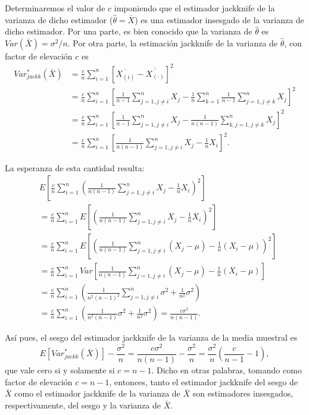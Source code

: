 \documentclass[
]{book}
\theoremstyle{break}
\theoremstyle{definition}
\theoremstyle{definition}
\theoremstyle{definition}
\theoremstyle{definition}
\theoremstyle{remark}
\begin{document}
Determinaremos el valor de \(c\) imponiendo que el estimador jackknife de la varianza de dicho estimador (\(\hat{\theta}=\bar{X}\)) es una estimador insesgado de la varianza de dicho estimador.
Por una parte, es bien conocido que la varianza de \(\hat{\theta}\) es \(Var\left( \bar{X} \right) = \sigma^2 /n\).
Por otra parte, la estimación jackknife de la varianza de \(\hat{\theta}\), con factor de elevación \(c\) es
\[\begin{aligned}
Var_{jackk}^{\ast}\left( \bar{X} \right) 
&= \frac{c}{n}\sum_{i=1}^{n}\left[ \overline{X_{(i)}}
-\overline{\overline{X_{\left( \cdot \right)}}}\right]^2 \\
&= \frac{c}{n}\sum_{i=1}^{n}\left[ \frac{1}{n-1}\sum_{j=1,j\neq i}^{n}X_j
- \frac{1}{n}\sum_{k=1}^{n}\frac{1}{n-1}\sum_{j=1,j\neq k}^{n}X_j\right]^2 \\
&= \frac{c}{n}\sum_{i=1}^{n}\left[ \frac{1}{n-1}\sum_{j=1,j\neq i}^{n}X_j
- \frac{1}{n\left( n-1 \right)}\sum_{k,j=1,j\neq k}^{n}X_j\right]^2 \\
&= \frac{c}{n}\sum_{i=1}^{n}\left[ \frac{1}{n\left( n-1 \right)}
\sum_{j=1,j\neq i}^{n}X_j-\frac{1}{n}X_i\right]^2.
\end{aligned}\]

La esperanza de esta cantidad resulta:
\[\begin{aligned}
&E\left[ \frac{c}{n}\sum_{i=1}^{n}\left( \frac{1}{n\left( n-1 \right)}
\sum_{j=1,j\neq i}^{n}X_j-\frac{1}{n}X_i \right)^2\right] \\
&= \frac{c}{n}\sum_{i=1}^{n}E\left[ \left( \frac{1}{n\left( n-1 \right)}
\sum_{j=1,j\neq i}^{n}X_j-\frac{1}{n}X_i \right)^2\right] \\
&= \frac{c}{n}\sum_{i=1}^{n}E\left[ \left( \frac{1}{n\left( n-1 \right)}
\sum_{j=1,j\neq i}^{n}\left( X_j-\mu \right) 
-\frac{1}{n}\left( X_i-\mu \right) \right)^2\right] \\
&= \frac{c}{n}\sum_{i=1}^{n}Var\left[ \frac{1}{n\left( n-1 \right)}
\sum_{j=1,j\neq i}^{n}\left( X_j-\mu \right) 
-\frac{1}{n}\left( X_i-\mu \right) \right]\\
&= \frac{c}{n}\sum_{i=1}^{n}\left( \frac{1}{n^2\left( n-1 \right)^2}
\sum_{j=1,j\neq i}^{n}\sigma^2+\frac{1}{n^2}\sigma^2 \right) \\
&= \frac{c}{n}\sum_{i=1}^{n}\left( \frac{1}{n^2\left( n-1 \right)}\sigma^2+\frac{1}{n^2}\sigma^2 \right) 
=\frac{c\sigma^2}{n\left(n-1 \right)}.
\end{aligned}\]

Así pues, el sesgo del estimador jackknife de la varianza de la media
muestral es
\[E\left[ Var_{jackk}^{\ast}\left( \bar{X} \right) \right] -\frac{\sigma^2}{n}
= \frac{c\sigma^2}{n\left( n-1 \right)} - \frac{\sigma^2}{n}
= \frac{\sigma^2}{n}\left( \frac{c}{n-1} - 1 \right),\]
que vale cero si y solamente si \(c=n-1\).
Dicho en otras palabras, tomando como factor de
elevación \(c=n-1\), entonces, tanto el estimador jackknife del sesgo de
\(\bar{X}\) como el estimador jackknife de la varianza de
\(\bar{X}\) son estimadores insesgados, respectivamente, del sesgo y
la varianza de \(\bar{X}\).
\end{document}
